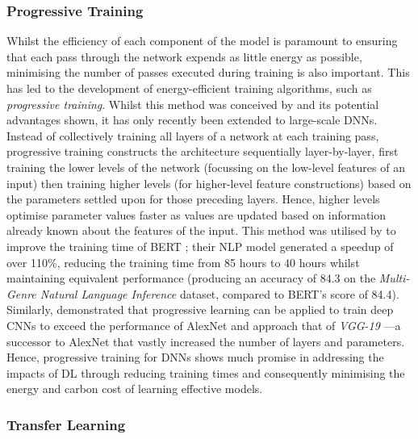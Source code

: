 \documentclass[a4paper, 12pt]{article}
\begin{document}
    \subsubsection{Progressive Training}

    Whilst the efficiency of each component of the model is paramount to ensuring that each pass through the network expends as little energy as possible, minimising the number of passes executed during training is also important. This has led to the development of energy-efficient training algorithms, such as \emph{progressive training}. Whilst this method was conceived by  and its potential advantages shown, it has only recently been extended to large-scale DNNs. Instead of collectively training all layers of a network at each training pass, progressive training constructs the architecture sequentially layer-by-layer, first training the lower levels of the network (focussing on the low-level features of an input) then training higher levels (for higher-level feature constructions) based on the parameters settled upon for those preceding layers. Hence, higher levels optimise parameter values faster as values are updated based on information already known about the features of the input. This method was utilised by  to improve the training time of BERT \cite{devlin-2019}; their NLP model generated a speedup of over 110\%, reducing the training time from 85 hours to 40 hours whilst maintaining equivalent performance (producing an accuracy of 84.3 on the \emph{Multi-Genre Natural Language Inference} dataset, compared to BERT's score of 84.4). Similarly,  demonstrated that progressive learning can be applied to train deep CNNs to exceed the performance of AlexNet and approach that of \emph{VGG-19} \cite{simonyan-2014}---a successor to AlexNet that vastly increased the number of layers and parameters. Hence, progressive training for DNNs shows much promise in addressing the impacts of DL through reducing training times and consequently minimising the energy and carbon cost of learning effective models.

    \subsubsection{Transfer Learning}
\end{document}
